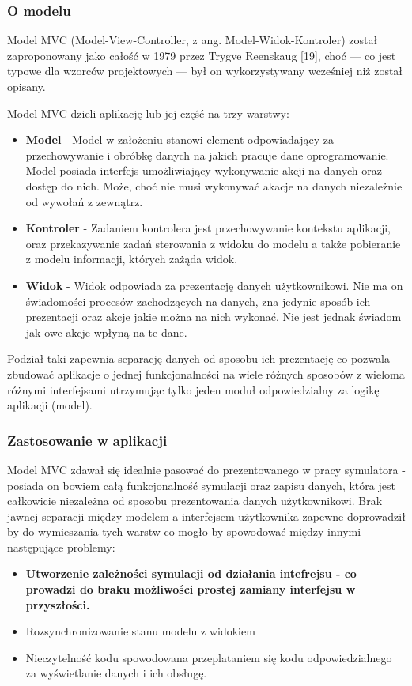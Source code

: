 {\subsubsection{O modelu}
\par{
Model MVC (Model-View-Controller, z ang. Model-Widok-Kontroler) został zaproponowany jako całość w 1979 przez Trygve Reenskaug [19], choć --- co jest typowe dla wzorców projektowych --- był on wykorzystywany wcześniej niż został opisany. 
}
\par{
Model MVC dzieli aplikację lub jej część na trzy warstwy:
\begin{itemize}
\item \textbf{Model} - Model w założeniu stanowi element odpowiadający za przechowywanie i obróbkę danych na jakich pracuje dane oprogramowanie. Model posiada interfejs umożliwiający wykonywanie akcji na danych oraz dostęp do nich. Może, choć nie musi wykonywać akacje na danych niezależnie od wywołań z zewnątrz.
\item \textbf{Kontroler} - Zadaniem kontrolera jest przechowywanie kontekstu aplikacji, oraz przekazywanie zadań sterowania z widoku do modelu a także pobieranie z modelu informacji, których zażąda widok.
\item \textbf{Widok} - Widok odpowiada za prezentację danych użytkownikowi. Nie ma on świadomości procesów zachodzących na danych, zna jedynie sposób ich prezentacji oraz akcje jakie można na nich wykonać. Nie jest jednak świadom jak owe akcje wpłyną na te dane.
\end{itemize}
}
\par{
Podział taki zapewnia separację danych od sposobu ich prezentację co pozwala zbudować aplikacje o jednej funkcjonalności na wiele różnych sposobów z wieloma różnymi interfejsami utrzymując tylko jeden moduł odpowiedzialny za logikę aplikacji (model).
}
\subsubsection{Zastosowanie w aplikacji}
\par{
Model MVC zdawał się idealnie pasować do prezentowanego w pracy symulatora - posiada on bowiem całą funkcjonalność symulacji oraz zapisu danych, która jest całkowicie niezależna od sposobu prezentowania danych użytkownikowi. Brak jawnej separacji między modelem a interfejsem użytkownika zapewne doprowadził by do wymieszania tych warstw co mogło by spowodować między innymi następujące problemy:
\begin{itemize}
\item \textbf{Utworzenie zależności symulacji od działania intefrejsu - co prowadzi do braku możliwości prostej zamiany interfejsu w przyszłości.}
\item Rozsynchronizowanie stanu modelu z widokiem
\item Nieczytelność kodu spowodowana przeplataniem się kodu odpowiedzialnego za wyświetlanie danych i ich obsługę.
\end{itemize}
}
}
